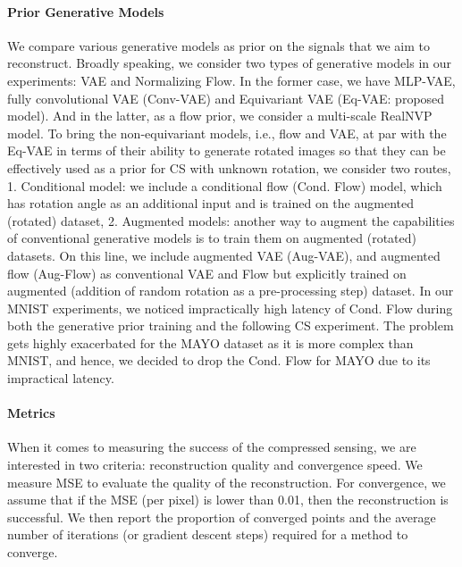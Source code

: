 \paragraph{Prior Generative Models}
We compare various generative models as prior on the signals that we aim to reconstruct. Broadly speaking, we consider two types of generative models in our experiments: VAE and Normalizing Flow. In the former case, we have MLP-VAE, fully convolutional VAE (Conv-VAE) and Equivariant VAE (Eq-VAE: proposed model). And in the latter, as a flow prior, we consider a multi-scale RealNVP model. To bring the non-equivariant models, i.e., flow and VAE, at par with the Eq-VAE in terms of their ability to generate rotated images so that they can be effectively used as a prior for CS with unknown rotation, we consider two routes, 1. Conditional model: we include a conditional flow (Cond. Flow) model, which has rotation angle as an additional input and is trained on the augmented (rotated) dataset, 2. Augmented models: another way to augment the capabilities of conventional generative models is to train them on augmented (rotated) datasets. On this line, we include augmented VAE (Aug-VAE), and augmented flow (Aug-Flow) as conventional VAE and Flow but explicitly trained on augmented (addition of random rotation as a pre-processing step) dataset. In our MNIST experiments, we noticed impractically high latency of Cond. Flow during both the generative prior training and the following CS experiment. The problem gets highly exacerbated for the MAYO dataset as it is more complex than MNIST, and hence, we decided to drop the Cond. Flow for MAYO due to its impractical latency.


\paragraph{Metrics}
When it comes to measuring the success of the compressed sensing, we are interested in two criteria: reconstruction quality and convergence speed. We measure MSE to evaluate the quality of the reconstruction. For convergence, we assume that if the MSE (per pixel) is lower than 0.01, then the reconstruction is successful. We then report the proportion of converged points and the average number of iterations (or gradient descent steps) required for a method to converge. 




